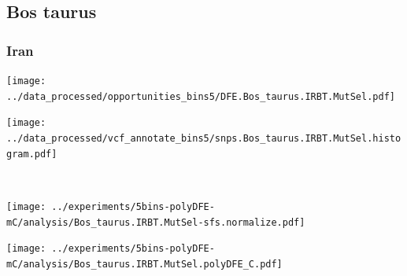 \subsection{Bos taurus}

\subsubsection{Iran}

\begin{minipage}{0.49\linewidth}
    \texttt{[image: ../data\_processed/opportunities\_bins5/DFE.Bos\_taurus.IRBT.MutSel.pdf]}
\end{minipage}
\begin{minipage}{0.49\linewidth}
    \texttt{[image: ../data\_processed/vcf\_annotate\_bins5/snps.Bos\_taurus.IRBT.MutSel.histogram.pdf]}
\end{minipage}
\\
\begin{minipage}{0.49\linewidth}
    \texttt{[image: ../experiments/5bins-polyDFE-mC/analysis/Bos\_taurus.IRBT.MutSel-sfs.normalize.pdf]}
\end{minipage}
\begin{minipage}{0.4\linewidth}
    \texttt{[image: ../experiments/5bins-polyDFE-mC/analysis/Bos\_taurus.IRBT.MutSel.polyDFE\_C.pdf]}
\end{minipage}

